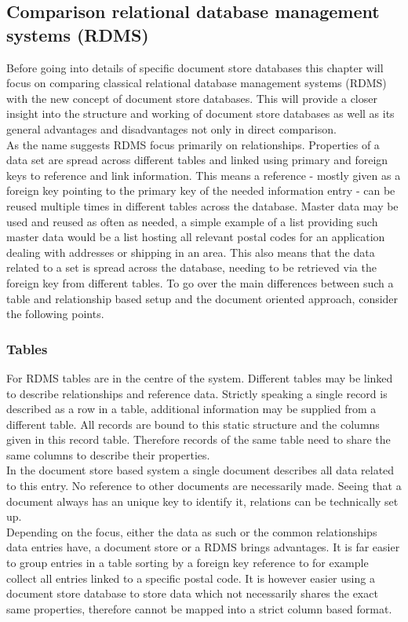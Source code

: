 \subsection{Comparison relational database management systems (RDMS)}
\label{docoriented:section:postalcodes}
Before going into details of specific document store databases this chapter will focus on comparing classical relational database management systems (RDMS) with the new concept of document store databases. This will provide a closer insight into the structure and working of document store databases as well as its general advantages and disadvantages not only in direct comparison.\\
As the name suggests RDMS focus primarily on relationships. Properties of a data set are spread across different tables and linked using primary and foreign keys to reference and link information. This means a reference - mostly given as a foreign key pointing to the primary key of the needed information entry - can be reused multiple times in different tables across the database. Master data may be used and reused as often as needed, a simple example of a list providing such master data would be a list hosting all relevant postal codes for an application dealing with addresses or shipping in an area. This also means that the data related to a set is spread across the database, needing to be retrieved via the foreign key from different tables. To go over the main differences between such a table and relationship based setup and the document oriented approach, consider the following points.
\subsubsection{Tables}
For RDMS tables are in the centre of the system. Different tables may be linked to describe relationships and reference data. Strictly speaking a single record is described as a row in a table, additional information may be supplied from a different table. All records are bound to this static structure and the columns given in this record table. Therefore records of the same table need to share the same columns to describe their properties.\\
In the document store based system a single document describes all data related to this entry. No reference to other documents are necessarily made. Seeing that a document always has an unique key to identify it, relations can be technically set up.\\
Depending on the focus, either the data as such or the common relationships data entries have, a document store or a RDMS brings advantages. It is far easier to group entries in a table sorting by a foreign key reference to for example collect all entries linked to a specific postal code. It is however easier using a document store database to store data which not necessarily shares the exact same properties, therefore cannot be mapped into a strict column based format.
